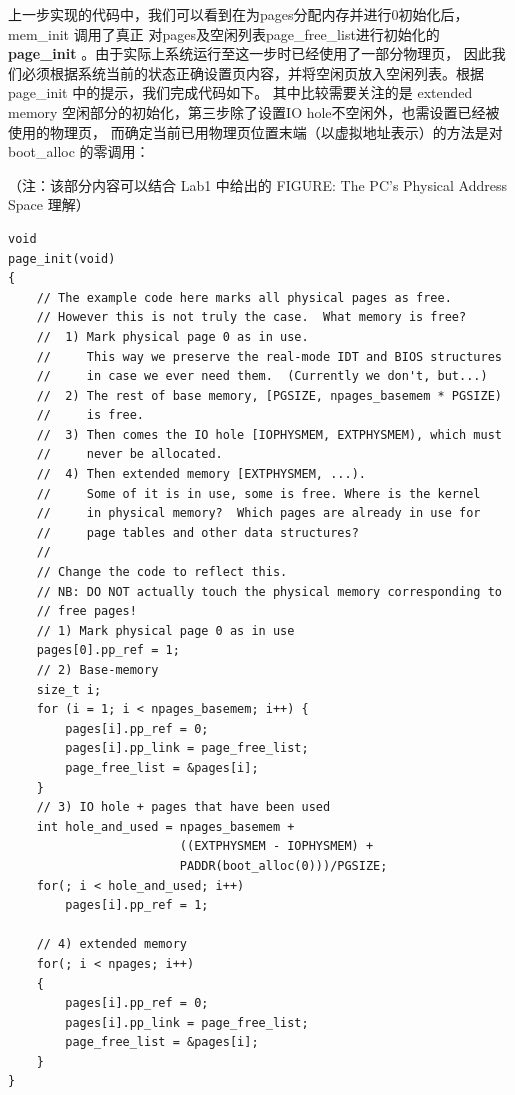 \documentclass[12pt, letterpaper]{report}
\begin{document}
上一步实现的代码中，我们可以看到在为pages分配内存并进行0初始化后，mem\_init 调用了真正
对pages及空闲列表page\_free\_list进行初始化的 
\textbf{page\_init} 。由于实际上系统运行至这一步时已经使用了一部分物理页，
因此我们必须根据系统当前的状态正确设置页内容，并将空闲页放入空闲列表。根据 page\_init 中的提示，我们完成代码如下。
其中比较需要关注的是 extended memory 空闲部分的初始化，第三步除了设置IO hole不空闲外，也需设置已经被使用的物理页，
而确定当前已用物理页位置末端（以虚拟地址表示）的方法是对 boot\_alloc 的零调用：\par 
（注：该部分内容可以结合 Lab1 中给出的 FIGURE: The PC's Physical Address Space 理解）\par 
\newpage
\lstset{style=CStyle}
\setmainfont{Consolas}
\begin{lstlisting}
void
page_init(void)
{
    // The example code here marks all physical pages as free.
    // However this is not truly the case.  What memory is free?
    //  1) Mark physical page 0 as in use.
    //     This way we preserve the real-mode IDT and BIOS structures
    //     in case we ever need them.  (Currently we don't, but...)
    //  2) The rest of base memory, [PGSIZE, npages_basemem * PGSIZE)
    //     is free.
    //  3) Then comes the IO hole [IOPHYSMEM, EXTPHYSMEM), which must
    //     never be allocated.
    //  4) Then extended memory [EXTPHYSMEM, ...).
    //     Some of it is in use, some is free. Where is the kernel
    //     in physical memory?  Which pages are already in use for
    //     page tables and other data structures?
    //
    // Change the code to reflect this.
    // NB: DO NOT actually touch the physical memory corresponding to
    // free pages!
    // 1) Mark physical page 0 as in use
    pages[0].pp_ref = 1;
    // 2) Base-memory
    size_t i;
    for (i = 1; i < npages_basemem; i++) {
        pages[i].pp_ref = 0;
        pages[i].pp_link = page_free_list;
        page_free_list = &pages[i];
    }
    // 3) IO hole + pages that have been used
    int hole_and_used = npages_basemem + 
                        ((EXTPHYSMEM - IOPHYSMEM) + 
                        PADDR(boot_alloc(0)))/PGSIZE;
    for(; i < hole_and_used; i++)
        pages[i].pp_ref = 1;

    // 4) extended memory
    for(; i < npages; i++)
    {
        pages[i].pp_ref = 0;
        pages[i].pp_link = page_free_list;
        page_free_list = &pages[i];
    }
}
\end{lstlisting}
\setmainfont{Times New Roman}
\quad \par
\end{document}

